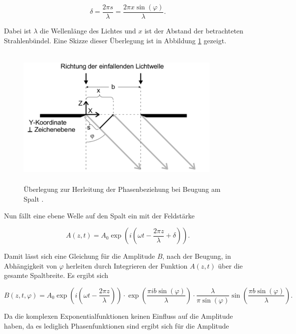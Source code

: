 \begin{equation*}
  \delta = \frac{2 \pi s}{\lambda} = \frac{2 \pi x \sin(\varphi)}{\lambda}.
\end{equation*}

Dabei ist $\lambda$ die Wellenlänge des Lichtes und $x$ ist der Abstand der
betrachteten Strahlenbündel. Eine Skizze dieser Überlegung ist in
Abbildung \ref{abb:2} gezeigt.

\begin{figure}[H]
  \centering
  \includegraphics[width=10cm, height=7cm]{content/Phasendifferenz.png}
  \caption{Überlegung zur Herleitung der Phasenbeziehung bei Beugung am Spalt \cite{1}.}
  \label{abb:2}
\end{figure}

Nun fällt eine ebene Welle auf den Spalt ein mit der Feldstärke

\begin{equation*}
  A(z,t) = A_0 \exp\left(i\left(\omega t - \frac{2 \pi z}{\lambda} + \delta\right)\right).
\end{equation*}

Damit lässt sich eine Gleichung für die Amplitude $B$, nach der Beugung, in Abhängigkeit von $\varphi$ herleiten
durch Integrieren der Funktion $A(z,t)$ über die gesamte Spaltbreite. Es ergibt sich

\begin{equation*}
  B(z,t,\varphi) = A_0 \exp\left(i\left(\omega t - \frac{2 \pi z}{\lambda}\right)\right)
  \cdot \exp\left(\frac{\pi i b \sin(\varphi)}{\lambda}\right) \cdot \frac{\lambda}{\pi \sin(\varphi)}
  \sin\left(\frac{\pi b \sin(\varphi)}{\lambda}\right).
\end{equation*}

Da die komplexen Exponentialfunktionen keinen Einfluss auf die Amplitude haben, da es
lediglich Phasenfunktionen sind ergibt sich für die Amplitude


